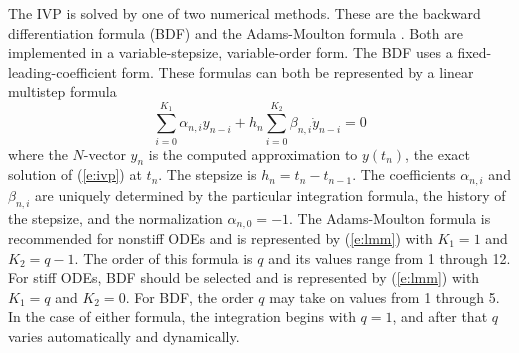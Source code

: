 The IVP is solved by one of two numerical methods. These are the
backward differentiation formula (BDF)  and the 
Adams-Moulton formula . 
Both are implemented in a variable-stepsize, variable-order form. The BDF
uses a fixed-leading-coefficient form. These formulas can both be
represented by a linear multistep formula 
\begin{equation}\label{e:lmm}
\sum_{i=0}^{K_1}\alpha_{n,i}y_{n-i} + h_n\sum_{i=0}^{K_2}\beta_{n,i} 
\dot{y}_{n-i}=0
\end{equation}
where the $N$-vector $y_n$ is the computed approximation to $y(t_n)$,
the exact solution of (\ref{e:ivp}) at $t_n$. The stepsize is
$h_n=t_n-t_{n-1}$.  The coefficients $\alpha_{n,i}$ and $\beta_{n,i}$
are uniquely determined by the particular integration formula, the
history of the stepsize, and the normalization $\alpha_{n,0}=-1$. The
Adams-Moulton  formula is recommended for nonstiff ODEs and is
represented by (\ref{e:lmm}) with $K_1=1$ and $K_2=q-1$. The order
of this formula is $q$ and its values range from 1 through 12. For
stiff ODEs, BDF  should be selected and is represented by 
(\ref{e:lmm}) with $K_1=q$ and $K_2=0$. For BDF, the order $q$ may
take on values from 1 through 5. In the case of either formula, the
integration begins with $q=1$, and after that $q$ varies automatically
and dynamically.

